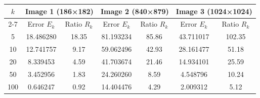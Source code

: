 \begin{tabular}{|c|c|c|c|c|c|c|}
\hline
\multirow{2}{*}{$k$} & \multicolumn{2}{c|}{\textbf{Image 1 (186×182)}} & 
\multicolumn{2}{c|}{\textbf{Image 2 (840×879)}} & 
\multicolumn{2}{c|}{\textbf{Image 3 (1024×1024)}} \\ \cline{2-7}
 & Error $E_k$ & Ratio $R_k$ & Error $E_k$ & Ratio $R_k$ & Error $E_k$ & Ratio $R_k$ \\ \hline
5   & 18.486280 & 18.35 & 81.193234 & 85.86 & 43.711017 & 102.35 \\ \hline
10  & 12.741757 & 9.17  & 59.062496 & 42.93 & 28.161477 & 51.18 \\ \hline
20  & 8.339453  & 4.59  & 41.703674 & 21.46 & 14.934101 & 25.59 \\ \hline
50  & 3.452956  & 1.83  & 24.260260 & 8.59  & 4.548796  & 10.24 \\ \hline
100 & 0.646247  & 0.92  & 14.404476 & 4.29  & 2.009312  & 5.12  \\ \hline
\end{tabular}